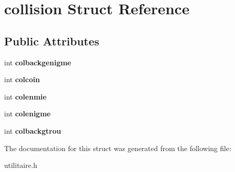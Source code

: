 \hypertarget{structcollision}{}\section{collision Struct Reference}
\label{structcollision}
\subsection*{Public Attributes}
\begin{DoxyCompactItemize}
\item 
int {\bfseries colbackgenigme}\hypertarget{structcollision_abcf86bca0068fca534f11c600c941da0}{}\label{structcollision_abcf86bca0068fca534f11c600c941da0}

\item 
int {\bfseries colcoin}\hypertarget{structcollision_a103941a41d31cbdb5a58c24fc75089a4}{}\label{structcollision_a103941a41d31cbdb5a58c24fc75089a4}

\item 
int {\bfseries colenmie}\hypertarget{structcollision_a71198421cdcfa728868a19e9e24507dc}{}\label{structcollision_a71198421cdcfa728868a19e9e24507dc}

\item 
int {\bfseries colenigme}\hypertarget{structcollision_a1ac28c83a10d8349661c5924338d5aa4}{}\label{structcollision_a1ac28c83a10d8349661c5924338d5aa4}

\item 
int {\bfseries colbackgtrou}\hypertarget{structcollision_abb7c93a7aed306b754319095b1dae1f7}{}\label{structcollision_abb7c93a7aed306b754319095b1dae1f7}

\end{DoxyCompactItemize}


The documentation for this struct was generated from the following file\+:\begin{DoxyCompactItemize}
\item 
utilitaire.\+h\end{DoxyCompactItemize}
